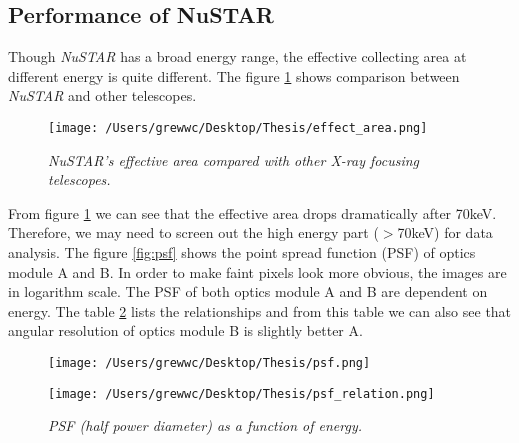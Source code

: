 \documentclass[12pt]{report}
\newcommand{\mycaption}[1]{\caption{\textit{\footnotesize #1}}}
\begin{document}
        \subsection{Performance of NuSTAR}
            Though \textit{NuSTAR} has a broad energy range, the effective collecting area at different energy is 
            quite different. The figure \ref{fig:effective_area} shows comparison between \textit{NuSTAR} and other 
            telescopes.
            \begin{figure}[h!]
              \centering
              \texttt{[image: /Users/grewwc/Desktop/Thesis/effect\_area.png]}
              \mycaption{\textit{NuSTAR}'s effective area compared with other X-ray focusing telescopes.}
              \label{fig:effective_area}
            \end{figure}
            
            From figure \ref{fig:effective_area} we can see that the effective area drops dramatically after 70keV.
            Therefore, we may need to screen out the high energy part ($>$70keV) for data analysis.
            The figure \ref{fig:psf} shows the point spread function (PSF) of optics module A and B. In order to
            make faint pixels look more obvious, the images are in logarithm scale. The PSF of both optics module A
            and B are dependent on energy. The table \ref{table:psf_relation} lists the relationships and from this 
            table we can also see that angular resolution of optics module B is slightly better A.
            
             
            \begin{figure}[!htp]
              \centering
              \texttt{[image: /Users/grewwc/Desktop/Thesis/psf.png]}
              \mycaption{Image of NuSTAR's point spread function of optics module A(left) and B(right).}
              \label{fig:psf}
              \vspace{1.5cm} 
              \texttt{[image: /Users/grewwc/Desktop/Thesis/psf\_relation.png]}
              \mycaption{PSF (half power diameter) as a function of energy.}
              \label{table:psf_relation}
            \end{figure}
\end{document}
